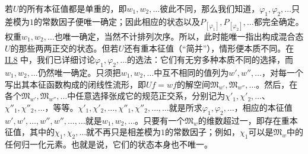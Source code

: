 \documentclass[fontsize=13pt,twoside,openany,headings=normal,parskip=false,bookmarkpackage=false,DIV=calc]{scrbook}
\begin{document}
若$U$的所有本征值都是单重的，即$w_1,\allowbreak w_2,\allowbreak \ldots$彼此不同，那么我们知道，$\varphi_1,\allowbreak \varphi_2,\allowbreak \ldots$只差模为$1$的常数因子便唯一确定；因此相应的状态以及$P_{[\varphi_1]},\allowbreak P_{[\varphi_2]},\allowbreak \ldots$都完全确定。权重$w_1,\allowbreak w_2,\allowbreak \ldots$也唯一确定，当然不计排列次序。所以，此时能唯一指出构成混合态$U$的那些两两正交的状态。但若$U$还有重本征值（“简并”），情形便本质不同。在 \hyperref[sec:II.8]{II.8} 中，我们已详细讨论$\varphi_1,\allowbreak \varphi_2,\allowbreak \ldots$的选法：它们有无穷多种本质不同的选择，而$w_1,\allowbreak w_2,\allowbreak \ldots$仍然唯一确定。只须把$w_1,\allowbreak w_2,\allowbreak \ldots$中互不相同的值列为$w',\allowbreak w'',\allowbreak \ldots$，对每一个写出其本征函数构成的闭线性流形，即$Uf=wf$的解空间$\mathfrak M_{w'},\allowbreak \mathfrak M_{w''},\allowbreak \ldots$。然后，在各个$\mathfrak M_{w'},\allowbreak \mathfrak M_{w''},\allowbreak \ldots$中任意选择张成它的规范正交系，分别记为$\chi'_1,\allowbreak \chi'_2,\allowbreak \ldots$、$\chi''_1,\allowbreak \chi''_2,\allowbreak \ldots$，等等。$\chi'_1,\allowbreak \chi'_2,\allowbreak \ldots,\allowbreak \chi''_1,\allowbreak \chi''_2,\allowbreak \ldots,\allowbreak \ldots$就是所求$\varphi_1,\allowbreak \varphi_2,\allowbreak \ldots$，相应的本征值$w',\allowbreak w',\allowbreak \ldots,\allowbreak w'',\allowbreak w'',\allowbreak \ldots,\allowbreak \ldots$就是$w_1,\allowbreak w_2,\allowbreak \ldots$。只要有一个$\mathfrak M_w$的维数超过一，即存在重本征值，其中的$\chi_1,\allowbreak \chi_2,\allowbreak \ldots$就不再只是相差模为$1$的常数因子；例如，$\chi_1$可以是$\mathfrak M_w$中的任何归一化元素。也就是说，它们的状态本身也不唯一。
\end{document}
